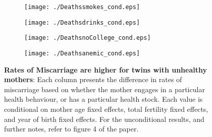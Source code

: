 \documentclass{nature}
\begin{document}
\begin{linenumbers}
\begin{spacing}{1}
\begin{figure}[htpb!]
\begin{subfigure}{.5\textwidth}
  \texttt{[image: ./Deathssmokes\_cond.eps]}
\end{subfigure}%
\begin{subfigure}{.5\textwidth}
  \texttt{[image: ./Deathsdrinks\_cond.eps]}
\end{subfigure}
\begin{subfigure}{.5\textwidth}
  \texttt{[image: ./DeathsnoCollege\_cond.eps]}
\end{subfigure}%
\begin{subfigure}{.5\textwidth}
  \texttt{[image: ./Deathsanemic\_cond.eps]}
\end{subfigure}
\vspace{5mm}
\caption{\textbf{Rates of Miscarriage are higher for twins with unhealthy mothers}: {\footnotesize Each column presents the difference in rates of miscarriage based on whether the mother engages in a particular health behaviour, or has a particular health stock.  Each value is conditional on mother age fixed effects, total fertility fixed effects, and year of birth fixed effects.  For the unconditional results, and further notes, refer to figure 4 of the paper.}}
\end{figure}
\end{spacing}


\end{linenumbers}
\end{document}
